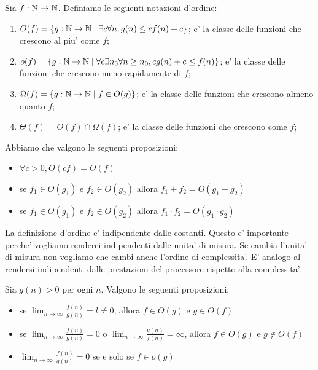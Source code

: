 \begin{defn}
    Sia $f: \mathbb{N} \to \mathbb{N}$. Definiamo le seguenti notazioni d'ordine:
    \begin{enumerate}
        \item $O(f) = \{g:\mathbb{N} \to \mathbb{N} \mid \exists c \forall n, g(n) \leq c f(n) + c\}$; e' la
        classe delle funzioni che crescono al piu' come $f$;
        \item $o(f) = \{g:\mathbb{N} \to \mathbb{N} \mid \forall c \exists n_{0} \forall n \geq n_{0}, c g(n)
        + c \leq f(n)\}$; e' la classe delle funzioni che crescono meno rapidamente di $f$;
        \item $\Omega(f) = \{g:\mathbb{N} \to \mathbb{N} \mid f \in O(g)\}$; e' la classe delle funzioni che
        crescono almeno quanto $f$;
        \item $\Theta(f) = O(f) \cap \Omega(f)$; e' la classe delle funzioni che crescono come $f$;
    \end{enumerate}
\end{defn}

Abbiamo che valgono le seguenti proposizioni:
\begin{itemize}
    \item $\forall c > 0, O(cf) = O(f)$ 
    \item se $f_{1} \in O(g_{1})$ e $f_{2} \in O(g_{2})$ allora $f_{1} + f_{2} = O(g_{1} + g_{2})$
    \item se $f_{1} \in O(g_{1})$ e $f_{2} \in O(g_{2})$ allora $f_{1}\cdot f_{2} = O(g_{1} \cdot g_{2})$
\end{itemize}

La definizione d'ordine e' indipendente dalle costanti. Questo e' importante perche' vogliamo
renderci indipendenti dalle unita' di misura. Se cambia l'unita' di misura non vogliamo che cambi
anche l'ordine di complessita'. E' analogo al rendersi indipendenti dalle prestazioni del processore
rispetto alla complessita'.

Sia $g(n) > 0$ per ogni $n$. Valgono le seguenti proposizioni:
\begin{itemize}
    \item se $\lim_{n \to \infty}\frac{f(n)}{g(n)} = l \not= 0$, allora $f \in O(g)$ e $g \in
    O(f)$
    \item se $\lim_{n \to \infty}\frac{f(n)}{g(n)} = 0$ o $\lim_{n \to \infty}\frac{g(n)}{f(n)} =
    \infty$, allora $f \in O(g)$ e $g \notin O(f)$
    \item $\lim_{n \to \infty}\frac{f(n)}{g(n)} = 0$ se e solo se $f \in o(g)$
\end{itemize}

